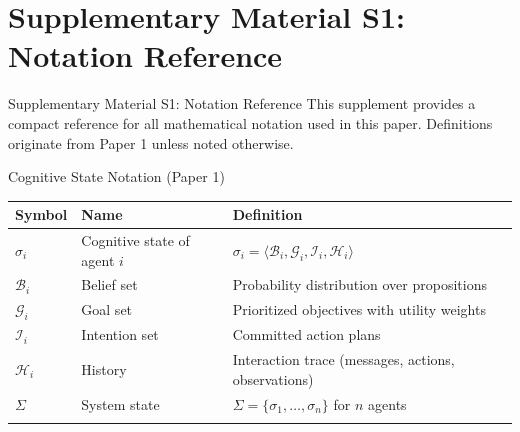 \documentclass[
  ignorenonframetext,
]{beamer}
\author{\texorpdfstring{}{}}
\date{}
\newcounter{none} %
\begin{document}
\section{Supplementary Material S1: Notation
Reference}\label{supplementary-material-s1-notation-reference}

\begin{frame}[allowframebreaks]{Supplementary Material S1: Notation
Reference}
This supplement provides a compact reference for all mathematical
notation used in this paper. Definitions originate from Paper 1
\cite{friedman2026cogsec1} unless noted otherwise.
\end{frame}

\begin{frame}[allowframebreaks]{Cognitive State Notation (Paper 1)}
\protect{}\label{cognitive-state-notation-paper-1}
{\def\LTcaptype{none} %
\begin{longtable}[]{@{}
  >{\raggedright\arraybackslash}p{}
  >{\raggedright\arraybackslash}p{}
  >{\raggedright\arraybackslash}p{}@{}}
\toprule\noalign{}
\begin{minipage}[b]{\linewidth}\raggedright
Symbol
\end{minipage} & \begin{minipage}[b]{\linewidth}\raggedright
Name
\end{minipage} & \begin{minipage}[b]{\linewidth}\raggedright
Definition
\end{minipage} \\
\midrule\noalign{}
\endhead
\(\sigma_i\) & Cognitive state of agent \(i\) &
\(\sigma_i = \langle \mathcal{B}_i, \mathcal{G}_i, \mathcal{I}_i, \mathcal{H}_i \rangle\) \\
\(\mathcal{B}_i\) & Belief set & Probability distribution over
propositions \\
\(\mathcal{G}_i\) & Goal set & Prioritized objectives with utility
weights \\
\(\mathcal{I}_i\) & Intention set & Committed action plans \\
\(\mathcal{H}_i\) & History & Interaction trace (messages, actions,
observations) \\
\(\Sigma\) & System state & \(\Sigma = \{\sigma_1, \ldots, \sigma_n\}\)
for \(n\) agents \\
\bottomrule\noalign{}
\end{longtable}
}
\end{frame}
\end{document}
